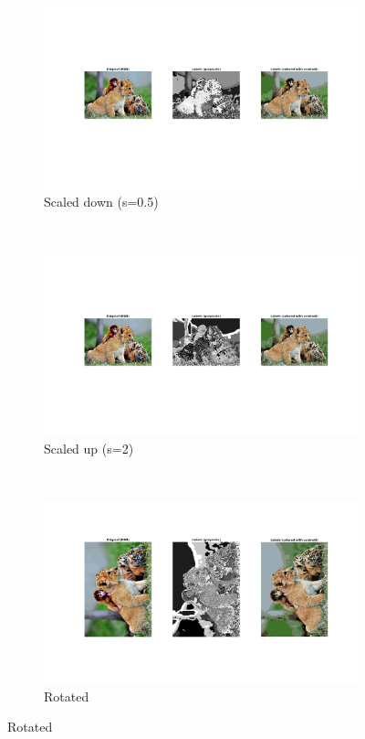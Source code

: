 \begin{figure}[hbt]
	\begin{subfigure}[t]{0.3 \textwidth}
		\includegraphics[trim={825px 250px 50px 220px},clip,width=\textwidth]{img/kmeans/animals_k10_no_spatial_scaled_down.png}
		\caption{Scaled down (s=0.5)}
		\label{fig:kmeans-geometric-transformations-scaled-down}
	\end{subfigure}
	~
	\begin{subfigure}[t]{0.3 \textwidth}
		\includegraphics[trim={825px 250px 50px 220px},clip,width=\textwidth]{img/kmeans/animals_k10_no_spatial_scaled_up.png}
		\caption{Scaled up (s=2)}
		\label{fig:kmeans-geometric-transformations-scaled-up}
	\end{subfigure}
	~
	\begin{subfigure}[t]{0.3 \textwidth}
		\includegraphics[trim={825px 250px 50px 150px},clip,width=\textwidth]{img/kmeans/animals_k10_no_spatial_rotated.png}
		\caption{Rotated}
		\label{fig:kmeans-geometric-transformations-rotated}
	\end{subfigure}
	

\end{figure}
